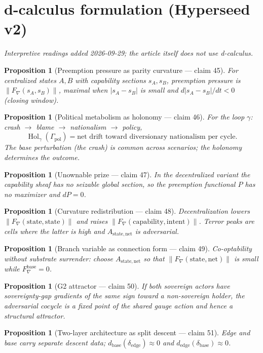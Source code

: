 \documentclass[11pt,a4paper]{article}
\newtheorem{proposition}[definition]{Proposition}
\begin{document}
\section{d-calculus formulation (Hyperseed v2)}
\emph{Interpretive readings added 2026-09-29; the article itself does not use d-calculus.}

\begin{proposition}[Preemption pressure as parity curvature --- claim 45]
For centralized states $A,B$ with capability sections $s_A,s_B$,
preemption pressure is $\|F_\nabla(s_A,s_B)\|$, maximal when
$|s_A-s_B|$ is small and $d|s_A-s_B|/dt<0$ (closing window).
\end{proposition}

\begin{proposition}[Political metabolism as holonomy --- claim 46]
For the loop $\gamma$: crash $\to$ blame $\to$ nationalism $\to$ policy,
\[
  \operatorname{Hol}_\gamma(\Gamma_{\mathrm{pol}})
  = \text{net drift toward diversionary nationalism per cycle}.
\]
The base perturbation (the crash) is common across scenarios; the
holonomy determines the outcome.
\end{proposition}

\begin{proposition}[Unownable prize --- claim 47]
In the decentralized variant the capability sheaf has no seizable global
section, so the preemption functional $P$ has no maximizer and $dP=0$.
\end{proposition}

\begin{proposition}[Curvature redistribution --- claim 48]
Decentralization lowers $\|F_\nabla(\mathrm{state},\mathrm{state})\|$ and raises
$\|F_\nabla(\mathrm{capability},\mathrm{intent})\|$. Terror peaks are cells
where the latter is high and $A_{\mathrm{state,net}}$ is adversarial.
\end{proposition}

\begin{proposition}[Branch variable as connection form --- claim 49]
Co-optability without substrate surrender: choose $A_{\mathrm{state,net}}$ so
that $\|F_\nabla(\mathrm{state},\mathrm{net})\|$ is small while
$F_\nabla^{\mathrm{base}}=0$.
\end{proposition}

\begin{proposition}[G2 attractor --- claim 50]
If both sovereign actors have sovereignty-gap gradients of the same sign
toward a non-sovereign holder, the adversarial cocycle is a fixed point of
the shared gauge action and hence a structural attractor.
\end{proposition}

\begin{proposition}[Two-layer architecture as split descent --- claim 51]
Edge and base carry separate descent data;
$d_{\mathrm{base}}(\delta_{\mathrm{edge}})\approx 0$ and
$d_{\mathrm{edge}}(\delta_{\mathrm{base}})\approx 0$.
\end{proposition}
\end{document}
